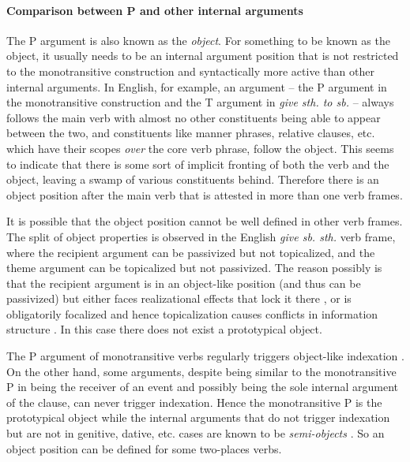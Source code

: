 \documentclass[a4paper, oneside, 12pt]{report}
\newcommand*{\citesec}[1]{\S~{#1}}
\newcommand*{\citepage}[1]{p.~{#1}}
\newcommand*{\term}[1]{\emph{#1}}
\newcommand{\form}[1]{\emph{#1}}
\begin{document}
\paragraph*{Comparison between P and other internal arguments}
\label{sec:grammatical.clause.internal.object}
The P argument is also known as the \term{object}.
For something to be known as the object,
it usually needs to be an internal argument position
that is not restricted to the monotransitive construction
and syntactically more active than other internal arguments.
In English, for example,
an argument -- the P argument in the monotransitive construction 
and the T argument in \form{give sth. to sb.} --
always follows the main verb with almost no other constituents
being able to appear between the two,
and constituents like manner phrases, relative clauses, etc.
which have their scopes \emph{over} the core verb phrase, follow the object.
This seems to indicate that there is some sort of implicit fronting 
of both the verb and the object,
leaving a swamp of various constituents behind.
Therefore there is an object position after the main verb
that is attested in more than one verb frames. 

It is possible that the object position cannot be well defined in other verb frames. 
The split of object properties is observed in the English \form{give sb. sth.} verb frame,
where the recipient argument can be passivized but not topicalized,
and the theme argument can be topicalized but not passivized.
The reason possibly is that the recipient argument is in an object-like position
(and thus can be passivized)
but either faces realizational effects that lock it there 
\citep{oba2005double},
or is obligatorily focalized and hence topicalization causes conflicts in information structure
\citep{im2005alternative}.
In this case there does not exist a prototypical object.

The P argument of monotransitive verbs regularly triggers object-like indexation
\citep[\citesec{8.1.3}, \citepage{543}]{jacques2021grammar}.
On the other hand, some arguments, 
despite being similar to the monotransitive P in being the receiver of an event 
and possibly being the sole internal argument of the clause,
can never trigger indexation.
Hence the monotransitive P is the prototypical object
while the internal arguments that do not trigger indexation 
but are not in genitive, dative, etc. cases
are known to be \term{semi-objects}
\citep[\citesec{8.1.5}]{jacques2021grammar}.
So an object position can be defined for some two-places verbs.
\end{document}
